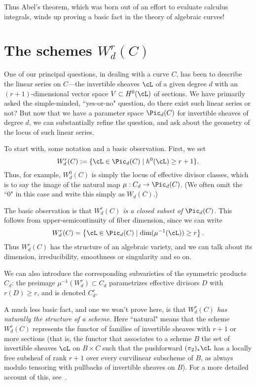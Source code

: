 Thus Abel's theorem, which was born out of an effort to evaluate calculus integrals, winds up proving a basic fact in the theory of algebraic curves!


\section{The schemes $W^r_d(C)$}

One of our principal questions, in dealing with a curve $C$, has been to describe the linear series on $C$---the invertible sheaves $\cL$ of a given degree $d$ with an $(r+1)$-dimensional  vector space $V \subset H^0(\cL)$ of sections. We have primarily asked the simple-minded, ``yes-or-no" question, do there exist such linear series or not? But now that we have a parameter space $\Pic_d(C)$ for invertible sheaves of degree $d$, we can substantially refine the question, and ask about the geometry of the locus of such linear series.

To start with, some notation and a basic observation. First, we set
$$
W^r_d(C) := \{ \cL \in \Pic_d(C) \mid h^0(\cL) \geq r+1 \}.
$$
Thus, for example, $W^0_d(C)$ is simply the locus of effective divisor classes, which is to say the image of the natural map $\mu : C_d \to \Pic_d(C)$. (We often omit the ``0" in this case and write this simply as $W_d(C)$.)

The basic observation is that \emph{$W^r_d(C)$ is a closed subset of $\Pic_d(C)$}. This follows from upper-semicontinuity of fiber dimension, since we can write
$$
W^r_d(C) = \left\{ \cL \in \Pic_d(C) \mid \dim(\mu^{-1}(\cL)) \geq r \right\}.
$$
Thus $W^r_d(C)$ has the structure of an algebraic variety, and we can talk about its dimension, irreducibility, smoothness or singularity and so on.

We can also introduce the corresponding subvarieties of the symmetric products $C_d$: the preimage $\mu^{-1}(W^r_d) \subset C_d$ parametrizes effective divisors $D$ with $r(D) \geq r$, and is denoted $C^r_d$.

A much less basic fact, and one we won't prove here, is that \emph{$W^r_d(C)$ has naturally the structure of a scheme}. Here ``natural" means that the scheme $W^r_d(C)$ represents the functor of families of invertible sheaves with $r+1$ or more sections (that is, the functor that associates to a scheme $B$ the set of invertible sheaves $\cL$ on $B \times C$ such that the pushforward $(\pi_2)_*\cL$ has a locally free subsheaf of rank $r+1$ over every curvilinear subscheme of $B$, as always modulo tensoring with pullbacks of invertible sheaves on $B$). For a more detailed account of this, see~\cite{ACGH}.

